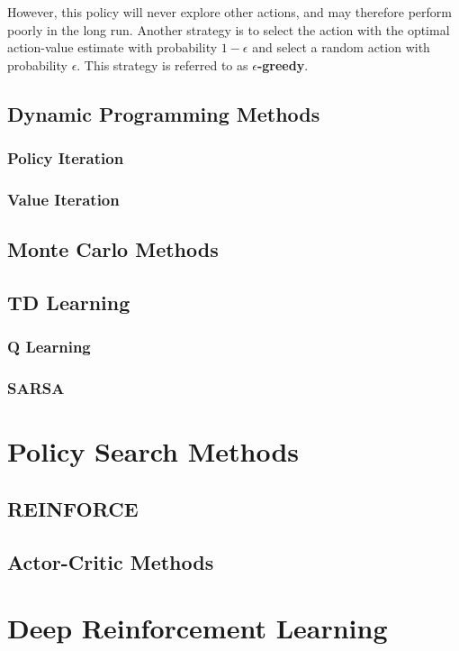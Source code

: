 \noindent However, this policy will never explore other actions, and may therefore perform poorly in the long run. Another strategy is to select the action with the optimal action-value estimate with probability $1 - \epsilon$ and select a random action with probability $\epsilon$. This strategy is referred to as $\epsilon$\textbf{-greedy}.

\subsection{Dynamic Programming Methods}

\subsubsection{Policy Iteration}

\subsubsection{Value Iteration}

\subsection{Monte Carlo Methods}

\subsection{TD Learning}

\subsubsection{Q Learning}

\subsubsection{SARSA}



\section{Policy Search Methods}
\label{sec: policy search methods}

\subsection{REINFORCE}

\subsection{Actor-Critic Methods}


\section{Deep Reinforcement Learning}
